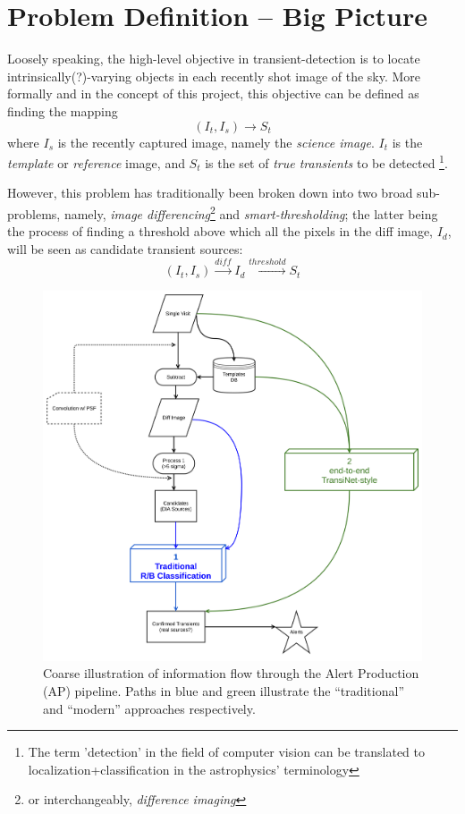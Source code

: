 \section{Problem Definition -- Big Picture}
\label{sec:definition}

Loosely speaking, the high-level objective in transient-detection is to locate intrinsically(?)-varying objects in each recently shot image of the sky.
More formally and in the concept of this project, this objective can be defined as finding the mapping
\begin{equation}
  \label{eq:def1}
  (I_t,I_s) \longrightarrow S_t 
\end{equation}
where $I_s$ is the recently captured image, namely the \emph{science image}. $I_t$ is the \emph{template} or \emph{reference} image, and $S_t$ is the set of \emph{true transients} to be detected \footnote{The term 'detection' in the field of computer vision can be translated to localization+classification in the astrophysics' terminology}.



However, this problem has traditionally been broken down into two broad sub-problems, namely, \emph{image differencing}\footnote{or interchangeably, \emph{difference imaging}} and \emph{smart-thresholding}; the latter being the process of finding a threshold above which all the pixels in the diff image, $I_d$, will be seen as candidate transient sources:
\begin{equation}
  \label{eq:def2}
  (I_t,I_s) \xrightarrow{diff} I_d \xrightarrow{threshold} S_t 
\end{equation}

\begin{figure}[h]
  \centering
  \includegraphics[width=.8\textwidth]{material/diagram}
  \caption{Coarse illustration of information flow through the Alert Production (AP) pipeline. Paths in blue and green illustrate the ``traditional'' and ``modern'' approaches respectively.}
  \label{fig:diagram}
\end{figure}


